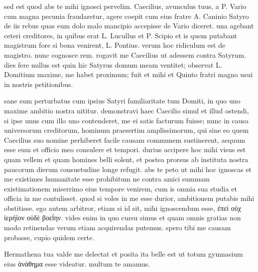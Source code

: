  sed est quod abs te mihi ignosci pervelim. Caecilius, avunculus tuus, a P. Vario cum magna pecunia fraudaretur, agere coepit cum eius fratre A. Caninio Satyro de iis rebus quas eum dolo malo mancipio accepisse de Vario diceret. una agebant ceteri creditores, in quibus erat L. Lucullus et P. Scipio et is quem putabant magistrum fore si bona venirent, L. Pontius. verum hoc ridiculum est de magistro. nunc cognosce rem. rogavit me Caecilius ut adessem contra Satyrum. dies fere nullus est quin hic Satyrus domum meam ventitet; observat L. Domitium maxime, me habet proximum; fuit et mihi et Quinto fratri magno usui in nostris petitionibus.

 sane sum perturbatus cum ipsius Satyri familiaritate tum Domiti, in quo uno maxime ambitio nostra nititur. demonstravi haec Caecilio simul et illud ostendi, si ipse unus cum illo uno contenderet, me ei satis facturum fuisse; nunc in causa universorum creditorum, hominum praesertim amplissimorum, qui sine eo quem Caecilius suo nomine perhiberet facile causam communem sustinerent, aequum esse eum et officio meo consulere et tempori. durius accipere hoc mihi visus est quam vellem et quam homines belli solent, et postea prorsus ab instituta nostra paucorum dierum consuetudine longe refugit. abs te peto ut mihi hoc ignoscas et me existimes humanitate esse prohibitum ne contra amici summam existimationem miserrimo eius tempore venirem, cum is omnia sua studia et officia in me contulisset. quod si voles in me esse durior, ambitionem putabis mihi obstitisse. ego autem arbitror, etiam si id sit, mihi ignoscendum esse, ἐπεὶ οὐχ ἱερήϊον οὐδὲ βοεΐην. vides enim in quo cursu simus et quam omnis gratias non modo retinendas verum etiam acquirendas putemus. spero tibi me causam probasse, cupio quidem certe.

 Hermathena tua valde me delectat et posita ita belle est ut totum gymnasium eius ἀνάθημα esse videatur. multum te amamus.
